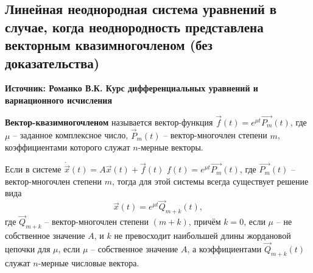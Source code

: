\subsection{Линейная неоднородная система уравнений в случае, когда неоднородность представлена векторным квазимногочленом (без доказательства)}

\textbf{Источник: Романко В.К. Курс дифференциальных уравнений и вариационного исчисления}

\begin{definition}
  \textbf{Вектор-квазимногочленом} называется вектор-функция $\overrightarrow{f}(t) = e^{\mu t} \overrightarrow{P_m}(t)$, где $\mu$ -- заданное комплексное число, $\overrightarrow{P}_m(t)$ -- вектор-многочлен степени $m$, коэффициентами которого служат $n$-мерные векторы. 
\end{definition}

\begin{theorem}
  Если в системе $\dot{\overrightarrow{x}}(t) = A \overrightarrow{x}(t) + \overrightarrow{f}(t)$ $f(t) = e^{\mu t} \overrightarrow{P_m}(t)$, где $\overrightarrow{P_m}(t)$ -- вектор-многочлен степени $m$, тогда для этой системы всегда существует решение вида
  \[ \overrightarrow{x}(t) = e^{\mu t} \overrightarrow{Q}_{m+k}(t),\]
  где $\overrightarrow{Q}_{m+k}$ -- вектор-многочлен степени $(m + k)$, причём $k = 0$, если $\mu$ -- не собственное значение $A$, и $k$ не превосходит наибольшей длины жордановой цепочки для $\mu$, если $\mu$ -- собственное значение $A$, а коэффициентами $\overrightarrow{Q}_{m+k}(t)$ служат $n$-мерные числовые вектора.
\end{theorem}
